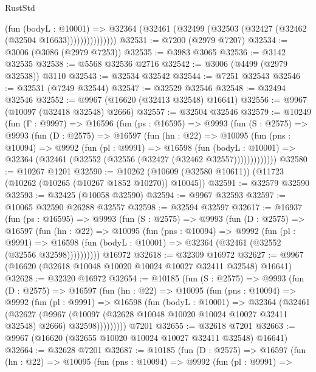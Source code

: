 \begin{lexlean}{RustStd}
\begin{coremodule}
                    (fun (bodyL : @10001) =>
                    @32364 (@32461 (@32499 (@32503 (@32427 (@32462 (@32504 @16633)))))))))))))))
@32531 := @7200 (@2979 @7207)
@32534 := @3006 (@3086 (@2979 @7253))
@32535 := @3983 @3065
@32536 := @3142 @32535
@32538 := @5568 @32536 @2716
@32542 := @3006 (@4499 (@2979 @32538)) @3110
@32543 := @32534 @32542
@32544 := @7251 @32543
@32546 := @32531 (@7249 @32544)
@32547 := @32529 @32546
@32548 := @32494 @32546
@32552 := @9967 (@16620 (@32413 @32548) @16641)
@32556 := @9967 (@10097 (@32418 @32548) @2666)
@32557 := @32504 @32546
@32579 := @10249
    (fun (Γ : @9997) =>
    @16596
      (fun (ps : @16595) =>
      @9993
        (fun (S : @2575) =>
        @9993
          (fun (D : @2575) =>
          @16597
            (fun (hn : @22) =>
            @10095
              (fun (pns : @10094) =>
              @9992
                (fun (pl : @9991) =>
                @16598
                  (fun (bodyL : @10001) =>
                  @32364 (@32461 (@32552 (@32556 (@32427 (@32462 @32557)))))))))))))
@32580 := @10267 @1201
@32590 := @10262 (@10609 (@32580 @10611)) (@11723 (@10262 (@10265 (@10267 @1852 @10270)) @10045))
@32591 := @32579 @32590
@32593 := @32425 (@10058 @32590)
@32594 := @9967 @32593
@32597 := @10065 @32590 @26288 @32557
@32598 := @32594 @32597
@32617 := @16937
    (fun (ps : @16595) =>
    @9993
      (fun (S : @2575) =>
      @9993
        (fun (D : @2575) =>
        @16597
          (fun (hn : @22) =>
          @10095
            (fun (pns : @10094) =>
            @9992
              (fun (pl : @9991) =>
              @16598 (fun (bodyL : @10001) => @32364 (@32461 (@32552 (@32556 @32598))))))))))
    @16972
@32618 := @32309 @16972
@32627 := @9967 (@16620 (@32618 @10048 @10020 @10024 @10027 @32411 @32548) @16641)
@32628 := @32320 @16972
@32654 := @10185
    (fun (S : @2575) =>
    @9993
      (fun (D : @2575) =>
      @16597
        (fun (hn : @22) =>
        @10095
          (fun (pns : @10094) =>
          @9992
            (fun (pl : @9991) =>
            @16598
              (fun (bodyL : @10001) =>
              @32364
                (@32461
                  (@32627
                    (@9967
                      (@10097 (@32628 @10048 @10020 @10024 @10027 @32411 @32548) @2666)
                      @32598)))))))))
    @7201
@32655 := @32618 @7201
@32663 := @9967 (@16620 (@32655 @10020 @10024 @10027 @32411 @32548) @16641)
@32664 := @32628 @7201
@32687 := @10185
    (fun (D : @2575) =>
    @16597
      (fun (hn : @22) =>
      @10095
        (fun (pns : @10094) =>
        @9992
          (fun (pl : @9991) =>

\end{coremodule}
\end{lexlean}

